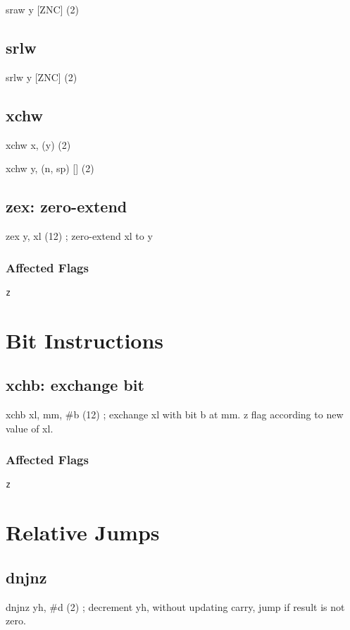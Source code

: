 \documentclass{book}
\begin{document}
sraw y [ZNC] (2)


\subsection{srlw}

srlw y [ZNC] (2)


\subsection{xchw}

xchw x, (y) (2)

xchw y, (n, sp) [] (2)


\subsection{zex: zero-extend}

zex y, xl (12) ; zero-extend xl to y

\subsubsection*{Affected Flags}

\texttt{z}


\section{Bit Instructions}

\subsection{xchb: exchange bit}

xchb xl, mm, \#b (12) ; exchange xl with bit b at mm. z flag according to new value of xl.

\subsubsection*{Affected Flags}

\texttt{z}


\section{Relative Jumps}

\subsection{dnjnz}

dnjnz yh, \#d (2) ; decrement yh, without updating carry, jump if result is not zero.
\end{document}
